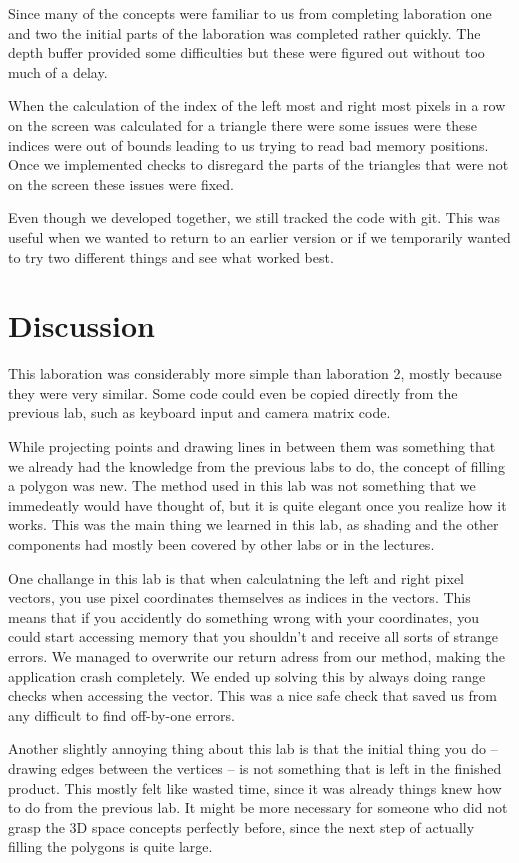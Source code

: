 \documentclass[a4paper]{article}
\begin{document}
Since many of the concepts were familiar to us from completing laboration one
and two the initial parts of the laboration was completed rather quickly. The
depth buffer provided some difficulties but these were figured out without too
much of a delay.

When the calculation of the index of the left most and right most pixels in a
row on the screen was calculated for a triangle there were some issues were 
these indices were out of bounds leading to us trying to read bad memory
positions. Once we implemented checks to disregard the parts of the triangles 
that were not on the screen these issues were fixed.

Even though we developed together, we still tracked the code with git.
This was useful when we wanted to return to an earlier version or if we
temporarily wanted to try two different things and see what worked best.

\section{Discussion}

This laboration was considerably more simple than laboration 2, mostly because they
were very similar. Some code could even be copied directly from the previous lab,
such as keyboard input and camera matrix code.

While projecting points and drawing lines in between them was something that we
already had the knowledge from the previous labs to do, the concept of filling
a polygon was new. The method used in this lab was not something that we
immedeatly would have thought of, but it is quite elegant once you realize how
it works. This was the main thing we learned in this lab, as shading and the other
components had mostly been covered by other labs or in the lectures.

One challange in this lab is that when calculatning the left and right pixel vectors,
you use pixel coordinates themselves as indices in the vectors. This means that if
you accidently do something wrong with your coordinates, you could start accessing
memory that you shouldn't and receive all sorts of strange errors. We managed to
overwrite our return adress from our method, making the application crash completely.
We ended up solving this by always doing range checks when accessing the vector.
This was a nice safe check that saved us from any difficult to find off-by-one errors.

Another slightly annoying thing about this lab is that the initial thing you do --
drawing edges between the vertices -- is not something that is left in the finished
product. This mostly felt like wasted time, since it was already things knew how to do
from the previous lab. It might be more necessary for someone who did not grasp the
3D space concepts perfectly before, since the next step of actually filling the
polygons is quite large.
\end{document}
